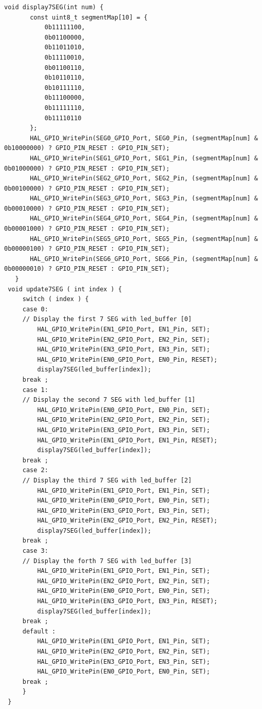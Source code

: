 \begin{lstlisting}[caption=software$\_$timer5.c]
void display7SEG(int num) {
       const uint8_t segmentMap[10] = {
           0b11111100,
           0b01100000,
           0b11011010,
           0b11110010,
           0b01100110,
           0b10110110,
           0b10111110,
           0b11100000,
           0b11111110,
           0b11110110
       };
       HAL_GPIO_WritePin(SEG0_GPIO_Port, SEG0_Pin, (segmentMap[num] & 0b10000000) ? GPIO_PIN_RESET : GPIO_PIN_SET);
       HAL_GPIO_WritePin(SEG1_GPIO_Port, SEG1_Pin, (segmentMap[num] & 0b01000000) ? GPIO_PIN_RESET : GPIO_PIN_SET);
       HAL_GPIO_WritePin(SEG2_GPIO_Port, SEG2_Pin, (segmentMap[num] & 0b00100000) ? GPIO_PIN_RESET : GPIO_PIN_SET);
       HAL_GPIO_WritePin(SEG3_GPIO_Port, SEG3_Pin, (segmentMap[num] & 0b00010000) ? GPIO_PIN_RESET : GPIO_PIN_SET);
       HAL_GPIO_WritePin(SEG4_GPIO_Port, SEG4_Pin, (segmentMap[num] & 0b00001000) ? GPIO_PIN_RESET : GPIO_PIN_SET);
       HAL_GPIO_WritePin(SEG5_GPIO_Port, SEG5_Pin, (segmentMap[num] & 0b00000100) ? GPIO_PIN_RESET : GPIO_PIN_SET);
       HAL_GPIO_WritePin(SEG6_GPIO_Port, SEG6_Pin, (segmentMap[num] & 0b00000010) ? GPIO_PIN_RESET : GPIO_PIN_SET);
   }
 void update7SEG ( int index ) {
	 switch ( index ) {
	 case 0:
	 // Display the first 7 SEG with led_buffer [0]
		 HAL_GPIO_WritePin(EN1_GPIO_Port, EN1_Pin, SET);
		 HAL_GPIO_WritePin(EN2_GPIO_Port, EN2_Pin, SET);
		 HAL_GPIO_WritePin(EN3_GPIO_Port, EN3_Pin, SET);
		 HAL_GPIO_WritePin(EN0_GPIO_Port, EN0_Pin, RESET);
		 display7SEG(led_buffer[index]);
	 break ;
	 case 1:
	 // Display the second 7 SEG with led_buffer [1]
		 HAL_GPIO_WritePin(EN0_GPIO_Port, EN0_Pin, SET);
		 HAL_GPIO_WritePin(EN2_GPIO_Port, EN2_Pin, SET);
		 HAL_GPIO_WritePin(EN3_GPIO_Port, EN3_Pin, SET);
		 HAL_GPIO_WritePin(EN1_GPIO_Port, EN1_Pin, RESET);
		 display7SEG(led_buffer[index]);
	 break ;
	 case 2:
	 // Display the third 7 SEG with led_buffer [2]
		 HAL_GPIO_WritePin(EN1_GPIO_Port, EN1_Pin, SET);
		 HAL_GPIO_WritePin(EN0_GPIO_Port, EN0_Pin, SET);
		 HAL_GPIO_WritePin(EN3_GPIO_Port, EN3_Pin, SET);
		 HAL_GPIO_WritePin(EN2_GPIO_Port, EN2_Pin, RESET);
		 display7SEG(led_buffer[index]);
	 break ;
	 case 3:
	 // Display the forth 7 SEG with led_buffer [3]
		 HAL_GPIO_WritePin(EN1_GPIO_Port, EN1_Pin, SET);
		 HAL_GPIO_WritePin(EN2_GPIO_Port, EN2_Pin, SET);
		 HAL_GPIO_WritePin(EN0_GPIO_Port, EN0_Pin, SET);
		 HAL_GPIO_WritePin(EN3_GPIO_Port, EN3_Pin, RESET);
		 display7SEG(led_buffer[index]);
	 break ;
	 default :
		 HAL_GPIO_WritePin(EN1_GPIO_Port, EN1_Pin, SET);
		 HAL_GPIO_WritePin(EN2_GPIO_Port, EN2_Pin, SET);
		 HAL_GPIO_WritePin(EN3_GPIO_Port, EN3_Pin, SET);
		 HAL_GPIO_WritePin(EN0_GPIO_Port, EN0_Pin, SET);
	 break ;
	 }
 }
 

\end{lstlisting}
